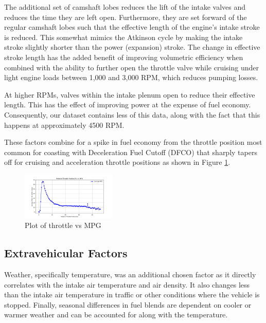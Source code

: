 \documentclass[letterpaper]{article}
\begin{document}
The additional set of camshaft lobes reduces the lift of the intake valves 
and reduces the time they are left open. Furthermore, they are set forward 
of the regular camshaft lobes such that the effective length of the 
engine's intake stroke is reduced. This somewhat mimics the Atkinson cycle 
by making the intake stroke slightly shorter than the power (expansion) 
stroke. The change in effective stroke length has the added benefit of 
improving volumetric efficiency when combined with the ability to further 
open the throttle valve while cruising under light engine loads between 
1,000 and 3,000 RPM, which reduces pumping losses.

At higher RPMs, valves within the intake plenum open to reduce their 
effective length. This has the effect of improving power at the expense 
of fuel economy. Consequently, our dataset contains less of this data, 
along with the fact that this happens at approximately 4500 RPM.

These factors combine for a spike in fuel economy from the throttle 
position most common for coasting with Deceleration Fuel Cutoff (DFCO) 
that sharply tapers off for cruising and acceleration throttle positions 
as shown in Figure \ref{fig:throttlevsmpg}. 

\begin{figure}[htbp]
    \centering
    \includegraphics[width=0.4\textwidth]{figures/throttle_vs_mpg.png}
    \caption{Plot of throttle vs MPG}
    \label{fig:throttlevsmpg}
\end{figure}

\subsection*{Extravehicular Factors}

Weather, specifically temperature, was an additional chosen factor as it 
directly correlates with the intake air temperature and air density. It 
also changes less than the intake air temperature in traffic or other 
conditions where the vehicle is stopped. Finally, seasonal differences in 
fuel blends are dependent on cooler or warmer weather and can be accounted 
for along with the temperature.
\end{document}

